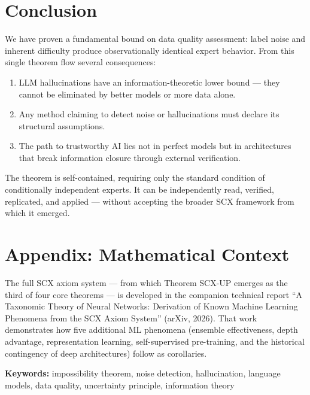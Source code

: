 \documentclass[12pt,a4paper]{ctexart}
\theoremstyle{definition}
\theoremstyle{remark}
\begin{document}
\section{Conclusion}

We have proven a fundamental bound on data quality assessment: label noise and inherent difficulty produce observationally identical expert behavior. From this single theorem flow several consequences:

\begin{enumerate}
\item LLM hallucinations have an information-theoretic lower bound — they cannot be eliminated by better models or more data alone.
\item Any method claiming to detect noise or hallucinations must declare its structural assumptions.
\item The path to trustworthy AI lies not in perfect models but in architectures that break information closure through external verification.
\end{enumerate}

The theorem is self-contained, requiring only the standard condition of conditionally independent experts. It can be independently read, verified, replicated, and applied — without accepting the broader SCX framework from which it emerged.

\section*{Appendix: Mathematical Context}

The full SCX axiom system — from which Theorem SCX-UP emerges as the third of four core theorems — is developed in the companion technical report ``A Taxonomic Theory of Neural Networks: Derivation of Known Machine Learning Phenomena from the SCX Axiom System'' (arXiv, 2026). That work demonstrates how five additional ML phenomena (ensemble effectiveness, depth advantage, representation learning, self-supervised pre-training, and the historical contingency of deep architectures) follow as corollaries.

\bigskip
\noindent\textbf{Keywords:} impossibility theorem, noise detection, hallucination, language models, data quality, uncertainty principle, information theory

\end{document}
